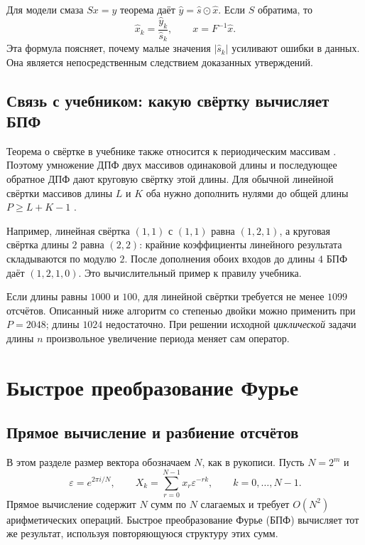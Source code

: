 \documentclass[12pt,a4paper]{article}
\theoremstyle{definition}
\theoremstyle{remark}
\newcommand{\eps}{\varepsilon}
\begin{document}
Для модели смаза $Sx=y$ теорема даёт $\widehat y=\widehat s\odot\widehat x$.
Если $S$ обратима, то
\[
  \widehat x_k=\frac{\widehat y_k}{\widehat s_k},\qquad
  x=F^{-1}\widehat x.
\]
Эта формула поясняет, почему малые значения $|\widehat s_k|$ усиливают
ошибки в данных. Она является непосредственным следствием доказанных
утверждений.

\subsection{Связь с учебником: какую свёртку вычисляет БПФ}

Теорема о свёртке в учебнике также относится к периодическим
массивам \cite[\S\,4.6.6, с.~298]{GW2012}.
Поэтому умножение ДПФ двух массивов одинаковой длины и последующее
обратное ДПФ дают круговую свёртку этой длины.
Для обычной линейной свёртки массивов длины $L$ и $K$ оба
нужно дополнить нулями до общей длины $P\geqslant L+K-1$
\cite[\S\,4.6.6, с.~300]{GW2012}.

Например, линейная свёртка $(1,1)$ с $(1,1)$ равна $(1,2,1)$,
а круговая свёртка длины $2$ равна $(2,2)$: крайние коэффициенты
линейного результата складываются по модулю $2$.
После дополнения обоих входов до длины $4$ БПФ даёт $(1,2,1,0)$.
Это вычислительный пример к правилу учебника.

Если длины равны $1000$ и $100$, для линейной свёртки требуется
не менее $1099$ отсчётов. Описанный ниже алгоритм со степенью
двойки можно применить при $P=2048$; длины $1024$ недостаточно.
При решении исходной \emph{циклической} задачи длины $n$
произвольное увеличение периода меняет сам оператор.

\section{Быстрое преобразование Фурье}

\subsection{Прямое вычисление и разбиение отсчётов}

В этом разделе размер вектора обозначаем $N$, как в рукописи.
Пусть $N=2^m$ и
\[
  \eps=e^{2\pi i/N},\qquad
  X_k=\sum_{r=0}^{N-1}x_r\eps^{-rk},\qquad k=0,\dots,N-1.
\]
Прямое вычисление содержит $N$ сумм по $N$ слагаемых и требует
$O(N^2)$ арифметических операций. Быстрое преобразование Фурье (БПФ)
вычисляет тот же результат, используя повторяющуюся структуру этих сумм.
\end{document}
